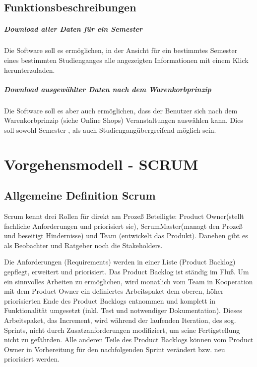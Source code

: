 \documentclass[11pt]{scrreprt}
\begin{document}
\section{Funktionsbeschreibungen}
\paragraph{Download aller Daten für ein Semester}
Die Software soll es ermöglichen, in der Ansicht für ein bestimmtes Semester eines bestimmten Studienganges alle angezeigten Informationen mit einem Klick herunterzuladen.

\paragraph{Download ausgewählter Daten nach dem Warenkorbprinzip}
Die Software soll es aber auch ermöglichen, dass der Benutzer sich nach dem Warenkorbprinzip (siehe Online Shops) Veranstaltungen auswählen kann. Dies soll sowohl Semester-, als auch Studiengangübergreifend möglich sein.

\chapter{Vorgehensmodell - SCRUM}
\section{Allgemeine Definition Scrum}

Scrum kennt drei Rollen für direkt am Prozeß Beteiligte: Product Owner(stellt fachliche Anforderungen und priorisiert sie), ScrumMaster(managt den Prozeß und beseitigt Hindernisse) und Team (entwickelt das Produkt). Daneben gibt es als Beobachter und Ratgeber noch die Stakeholders.

Die Anforderungen (Requirements) werden in einer Liste (Product Backlog) gepflegt, erweitert und priorisiert. Das Product Backlog ist ständig im Fluß. Um ein sinnvolles Arbeiten zu ermöglichen, wird monatlich vom Team in Kooperation mit dem Product Owner ein definiertes Arbeitspaket dem oberen, höher priorisierten Ende des Product Backlogs entnommen und komplett in Funktionalität umgesetzt (inkl. Test und notwendiger Dokumentation). Dieses Arbeitspaket, das Increment, wird während der laufenden Iteration, des sog. Sprints, nicht durch Zusatzanforderungen modifiziert, um seine Fertigstellung nicht zu gefährden. Alle anderen Teile des Product Backlogs können vom Product Owner in Vorbereitung für den nachfolgenden Sprint verändert bzw. neu priorisiert werden.
\end{document}
